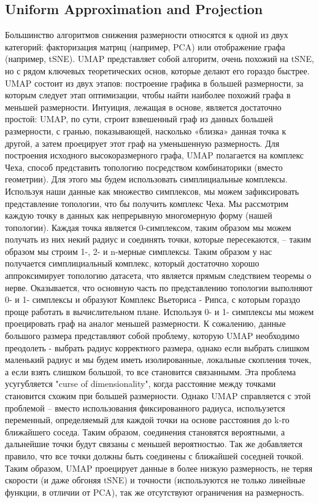 \newpage
\subsection{Uniform Approximation and Projection}

Большинство алгоритмов снижения размерности относятся к одной из двух категорий: факторизация матриц (например, PCA) или отображение графа (например, tSNE).  UMAP представляет собой алгоритм, очень похожий на tSNE, но с рядом ключевых теоретических основ, которые делают его гораздо быстрее. UMAP состоит из двух этапов: построение графика в большей размерности, за которым следует этап оптимизации, чтобы найти наиболее похожий графа в меньшей размерности. Интуиция, лежащая в основе, является достаточно простой: UMAP, по сути, строит взвешенный граф из данных большей размерности, с гранью, показывающей, насколько «близка» данная точка к другой, а затем проецирует этот граф на уменьшенную размерность. Для построения исходного высокоразмерного графа, UMAP полагается на комплекс Чеха, способ представить топологию посредством комбинаторики (вместо геометрии). Для этого мы будем использовать симплициальные комплексы. Используя наши данные как множество симплексов, мы можем зафиксировать представление топологии, что бы получить комплекс Чеха. Мы рассмотрим каждую точку в данных как непрерывную многомерную форму (нашей топологии). Каждая точка является 0-симплексом, таким образом мы можем получать из них некий радиус и соединять точки, которые пересекаются, -- таким образом мы строим 1-, 2- и n-мерные симплексы. Таким образом у нас получается симплициальный комплекс, который достаточно хорошо аппроксимирует топологию датасета, что является прямым следствием теоремы о нерве. Оказывается, что основную часть по представлению топологии выполняют 0- и 1- симплексы и образуют Комплекс Вьеториса - Рипса, с которым гораздо проще работать в вычислительном плане. Используя 0- и 1- симплексы мы можем проецировать граф на аналог меньшей размерности.
К сожалению, данные большого размера представляют собой проблему, которую UMAP необходимо преодолеть - выбрать радиус корректного размера, однако если выбрать слишком маленький радиус и мы будем иметь изолированные, локальные скопления точек, а если взять слишком большой, то все становится связаннымм. Эта проблема усугубляется "curse of dimensionality", когда расстояние между точками становится схожим при большей размерности. Однако UMAP справляется с этой проблемой -- вместо использования фиксированного радиуса, испольузется переменный, определяемый для каждой точки на основе расстояния до k-го ближайшего соседа. Таким образом, соединения становятся вероятными, а дальнейшие точки будут связаны с меньшей вероятностью. Так же добавляется правило, что все точки должны быть соединены с ближайшей соседней точкой. Таким образом, UMAP проецирует данные в более низкую размерность, не теряя скорости (и даже обгоняя tSNE) и точности (используются не только линейные функции, в отличии от PCA), так же отсутствуют ограничения на размерность.

